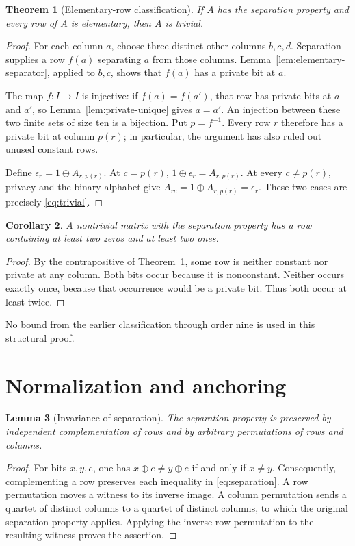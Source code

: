 \documentclass[11pt]{article}
\newtheorem{theorem}{Theorem}[section]
\newtheorem{lemma}[theorem]{Lemma}
\newtheorem{corollary}[theorem]{Corollary}
\theoremstyle{definition}
\theoremstyle{remark}
\newcommand{\I}{I}
\begin{document}
\begin{theorem}[Elementary-row classification]
\label{thm:elementary}
If $A$ has the separation property and every row of $A$ is elementary,
then $A$ is trivial.
\end{theorem}
\begin{proof}
For each column $a$, choose three distinct other columns $b,c,d$.
Separation supplies a row $f(a)$ separating $a$ from those columns.
Lemma~\ref{lem:elementary-separator}, applied to $b,c$, shows that
$f(a)$ has a private bit at $a$.

The map $f:\I\to\I$ is injective: if $f(a)=f(a')$, that row has
private bits at $a$ and $a'$, so
Lemma~\ref{lem:private-unique} gives $a=a'$. An injection between these
two finite sets of size ten is a bijection. Put $p=f^{-1}$. Every row
$r$ therefore has a private bit at column $p(r)$; in particular, the
argument has also ruled out unused constant rows.

Define $\epsilon_r=1\oplus A_{r,p(r)}$. At $c=p(r)$,
$1\oplus\epsilon_r=A_{r,p(r)}$. At every $c\ne p(r)$, privacy and
the binary alphabet give $A_{rc}=1\oplus A_{r,p(r)}=\epsilon_r$.
These two cases are precisely \eqref{eq:trivial}.
\end{proof}

\begin{corollary}
\label{cor:nontrivial-row}
A nontrivial matrix with the separation property has a row containing
at least two zeros and at least two ones.
\end{corollary}
\begin{proof}
By the contrapositive of Theorem~\ref{thm:elementary}, some row is
neither constant nor private at any column. Both bits occur because it
is nonconstant. Neither occurs exactly once, because that occurrence
would be a private bit. Thus both occur at least twice.
\end{proof}

No bound from the earlier classification through order nine is used in
this structural proof.

\section{Normalization and anchoring}
\label{sec:normalization}

\begin{lemma}[Invariance of separation]
\label{lem:invariance}
The separation property is preserved by independent complementation of
rows and by arbitrary permutations of rows and columns.
\end{lemma}
\begin{proof}
For bits $x,y,e$, one has $x\oplus e\ne y\oplus e$ if and only if
$x\ne y$. Consequently, complementing a row preserves each inequality
in \eqref{eq:separation}. A row permutation moves a witness to its
inverse image. A column permutation sends a quartet of distinct
columns to a quartet of distinct columns, to which the original
separation property applies. Applying the inverse row permutation to
the resulting witness proves the assertion.
\end{proof}
\end{document}
